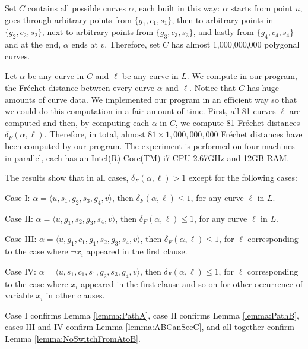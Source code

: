 \documentclass[12pt]{dalthesis}
\newcommand{\Frechet}{Fr\'echet }
\newcommand{\distF}{\delta_F}
\begin{document}
Set $C$ contains all possible curves $\alpha$, 
each built in this way: 
$\alpha$ starts from point $u$, 
goes through arbitrary points from $\{g_1,c_1,s_1\}$, 
then to arbitrary points in $\{g_2,c_2,s_2\}$, next
to arbitrary points from $\{g_3,c_3,s_3\}$, and lastly 
from $\{g_4,c_4,s_4\}$
and at the end, 
$\alpha$ ends at $v$.
Therefore, set $C$ has almost 1,000,000,000 polygonal curves.


Let $\alpha$ be any curve in $C$ 
and $\ell$ be any curve in $L$. 
We compute in our program, the \Frechet distance between every curve $\alpha$ and $\ell$.
Notice that $C$ has huge amounts of curve data. We implemented our 
program in an efficient way so 
that we could do this computation in 
a fair amount of time. First, 
all 81 curves $\ell$ are computed and then, 
by computing each $\alpha$ in $C$, 
we compute 81 \Frechet distances 
$\distF(\alpha,\ell)$. Therefore, in total, 
almost $81 \times 1,000,000,000$ 
\Frechet distances have been computed by our program. 
The experiment is 
performed on four machines in parallel, each 
has an Intel(R) Core(TM) i7 CPU 2.67GHz and 12GB RAM.


  
The results show that in all cases,
$\distF(\alpha,\ell) > 1$ 
except for the following cases:
\vspace{0.1 in}

Case I:  $\alpha = \langle u,s_1,g_2,s_3,g_4,v \rangle$, then 
$\distF(\alpha,\ell) \le  1$, for any curve $\ell$ in $L$. 


Case II:  $\alpha = \langle u,g_1,s_2,g_3,s_4,v \rangle$, then 
$\distF(\alpha,\ell) \le  1$, for any curve $\ell$ in $L$.
 
Case III:  $\alpha = \langle u,g_1,c_1,g_1,s_2,g_3,s_4,v \rangle$, then 
$\distF(\alpha,\ell) \le  1$, for $\ell$ corresponding to the case 
where $\neg x_i$ appeared in the 
first clause. 



Case IV: $\alpha = \langle u,s_1,c_1,s_1,g_2,s_3,g_4,v \rangle$, 
then 
$\distF(\alpha,\ell) \le  1$, for $\ell$ corresponding to the case 
where $x_i$ appeared in the 
first clause 
and so on for other occurrence of 
variable $x_i$ in other clauses. 



\vspace{0.1 in}
Case I confirms Lemma \ref{lemma:PathA},
case II confirms Lemma \ref{lemma:PathB},
cases III and IV confirm Lemma \ref{lemma:ABCanSeeC},
and all together confirm Lemma \ref{lemma:NoSwitchFromAtoB}.
\end{document}
